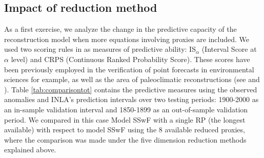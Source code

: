 \documentclass[11pt]{amsart}
\theoremstyle{plain}
\theoremstyle{definition}
\theoremstyle{remark}
\begin{document}
\subsection{Impact of reduction method}
As a first exercise, we analyze the change in the predictive capacity of the
reconstruction model when more equations involving proxies are included. We used
two scoring rules in \cite{Gneiting2007a} as measures of predictive ability:
IS$_\alpha$ (Interval Score at $\alpha$ level) and CRPS (Continuous Ranked
Probability Score). These scores have been previously employed in the
verification of point forecasts in environmental sciences for example, as well as the area
of paleoclimatic reconstructions (see \cite{Barboza2014} and
\cite{Scheuerer2014}). Table \ref{tab:comparisontot} contains the predictive
measures using the observed anomalies and INLA's prediction intervals over two
testing periods: 1900-2000 as an in-sample validation interval and 1850-1899 as an
out-of-sample validation period. We compared in this case Model SSwF with a single RP
(the longest available) with respect to model SSwF using the 8 available reduced
proxies, where the comparison was made under the five dimension reduction
methods explained above.
\end{document}
